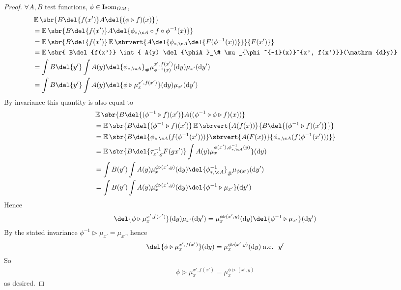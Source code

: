 \begin{proof} \(\forall A, B\) test functions, \(\phi \in \operatorname{Isom}_{GM}\), \begin{align*} &\E\sbr{B\del{f(x')}A\del{(\phi \triangleright f)(x)} }\\ & = \E\sbr{ B\del{f(x')} A\del{{\phiA \circ f \circ \phi^{-1}}(x)}} \\ & = \E\sbr{ B\del{f(x')} \E\sbrvert{A\del{\phiA\del{F(\phi^{-1}(x))}}}{F(x')}} \\ & = \E\sbr{ B\del{f(x')} \int{ A(y) \del{\phiA}_\# \mu_{\phi^{-1}(x)}^{x', f(x')}}(\mathrm{d}y)} \\ & = \int{ B\del{y'} \int{ A(y) \del{\phiA}_\# \mu_{\phi^{-1}(x)}^{x', f(x')}}(\mathrm{d}y) \mu_{x'}(\mathrm{d}y')} \\ & = \int{ B\del{y'} \int{ A(y) \del{\phi \triangleright \mu_{x}^{x', f(x')}}}(\mathrm{d}y) \mu_{x'}(\mathrm{d}y')} \\ \end{align*} By invariance this quantity is also equal to \begin{align*} &\E\sbr{B\del{(\phi^{-1}\triangleright f)(x')} A((\phi^{-1}\triangleright \phi \triangleright f)(x))} \\& = \E\sbr{B\del{(\phi^{-1}\triangleright f)(x')} \E\sbrvert{ A(f(x))}{B\del{(\phi^{-1}\triangleright f)(x')}}} \\ & = \E\sbr{B\del{\phiA (f(\phi^{-1}(x')))} \sbrvert{ A(F(x))}{\phiA (f(\phi^{-1}(x')))}} \\ & = \E\sbr{B\del{\tau_{x', g}^{-1} F(gx')} \int{ A(y) \mu_x^{\phi(x'), \phiA^{-1}(y)}}}(\mathrm{d}y) \\ & = \int{B(y')\int{ A(y) \mu_x^{\phi\triangleright (x', y)}}}(\mathrm{d}y) \del{\phiA^{-1}}_\# \mu_{\phi(x')}(\mathrm{d}y') \\ & = \int{B(y')\int{ A(y) \mu_x^{\phi\triangleright (x', y)}}}(\mathrm{d}y) \del{\phi^{-1} \triangleright \mu_{x'}}(\mathrm{d}y') \\ \end{align*} Hence \begin{align*} \del{\phi \triangleright \mu_{x}^{x', f(x')}}(\mathrm{d}y) \mu_{x'}(\mathrm{d}y') = \mu_x^{\phi\triangleright (x', y)}(\mathrm{d}y) \del{\phi^{-1} \triangleright \mu_{x'}}(\mathrm{d}y') \end{align*} By the stated invariance \( \phi^{-1} \triangleright \mu_{x'} = \mu_{x'}\), hence \begin{align*} \del{\phi \triangleright \mu_{x}^{x', f(x')}}(\mathrm{d}y) = \mu_x^{\phi\triangleright (x', y)}(\mathrm{d}y) \;\text{a.e.
		}\;y'
	\end{align*}
	So \begin{align} \phi \triangleright \mu_{x}^{x', f(x')} = \mu_x^{\phi\triangleright (x', y)} \end{align} as desired.
\end{proof}

